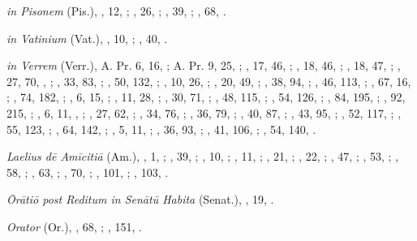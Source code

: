 \begin{autindex}
  \subitem \emph{in Pisonem} (Pis.),
    , 12, ;
    , 26, ;
    , 39, ;
    , 68, .

  \subitem \emph{in Vatinium} (Vat.),
    , 10, ;
    , 40, .

  \subitem \emph{in Verrem} (Verr.),
    \subsubitem A. Pr. 6, 16, ;
    \subsubitem A. Pr. 9, 25, ;
    , 17,  46, ;
    , 18,  46, ;
    , 18,  47, ;
    , 27,  70, , ;
    , 33,  83, ;
    , 50, 132, ;
    , 10,  26, ;
    , 20,  49, ;
    , 38,  94, ;
    , 46, 113, ;
    , 67,  16, ;
    , 74, 182, ;
    ,  6,  15, ;
    , 11,  28, ;
    , 30,  71, ;
    , 48, 115, ;
    , 54, 126, ;
    , 84, 195, ;
    , 92, 215, ;
    ,  6,  11, , ;
    , 27,  62, ;
    , 34,  76, ;
    , 36,  79, ;
    , 40,  87, ;
    , 43,  95, ;
    , 52, 117, ;
    , 55, 123, ;
    , 64, 142, ;
    ,  5,  11, ;
    , 36,  93, ;
    , 41, 106, ;
    , 54, 140, .

  \subitem \emph{Laelius dē Amīcitiā} (Am.),
    ,   1, ;
    ,  39, ;
    ,  10, ;
    ,  11, ;
    ,  21, ;
    ,  22, ;
    ,  47, ;
    ,  53, ;
    ,  58, ;
    ,  63, ;
    ,  70, ;
    , 101, ;
    , 103, .

  \subitem \emph{Ōrātiō post Reditum in Senātū Ha\-bi\-ta} (Senat.),
    , 19, .

  \subitem \emph{Orator} (Or.),
    ,  68, ;
    , 151, .


\end{autindex}
